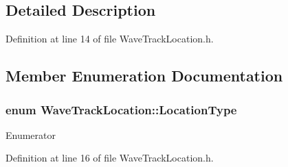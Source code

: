 \subsection{Detailed Description}


Definition at line 14 of file Wave\+Track\+Location.\+h.



\subsection{Member Enumeration Documentation}
\subsubsection[{\texorpdfstring{Location\+Type}{LocationType}}]{\setlength{\rightskip}{0pt plus 5cm}enum {\bf Wave\+Track\+Location\+::\+Location\+Type}}\hypertarget{struct_wave_track_location_a0a54a8fbcc73dfe63879bcff10a75c6d}{}\label{struct_wave_track_location_a0a54a8fbcc73dfe63879bcff10a75c6d}
\begin{Desc}
\item[Enumerator]\par
\begin{description}
\item[{\em 
location\+Cut\+Line\hypertarget{struct_wave_track_location_a0a54a8fbcc73dfe63879bcff10a75c6da399879306fdea1e62201b1045d682e78}{}\label{struct_wave_track_location_a0a54a8fbcc73dfe63879bcff10a75c6da399879306fdea1e62201b1045d682e78}
}]\item[{\em 
location\+Merge\+Point\hypertarget{struct_wave_track_location_a0a54a8fbcc73dfe63879bcff10a75c6da871a4f5cfaaaa8055d719336eca06f11}{}\label{struct_wave_track_location_a0a54a8fbcc73dfe63879bcff10a75c6da871a4f5cfaaaa8055d719336eca06f11}
}]\end{description}
\end{Desc}


Definition at line 16 of file Wave\+Track\+Location.\+h.



